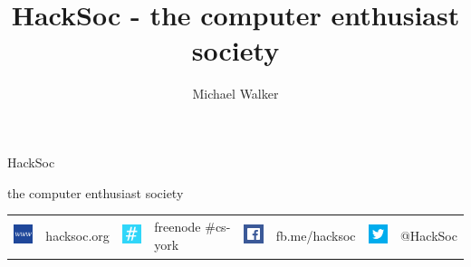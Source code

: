\documentclass[10pt,a4paper,oneside]{article}
\author{Michael Walker}
\title{HackSoc - the computer enthusiast society}
\begin{document}

\begin{adjustbox}{minipage=0.9\linewidth,center}
  {\fontsize{2.75cm}{1em}  HackSoc}

  \vspace{0.35cm}

  \hfill {\fontsize{0.9cm}{1em}  the computer enthusiast society}
\end{adjustbox}



\vspace{0.3cm}

\begin{tabular}{llllllll}
\multicolumn{1}{m{1cm}}{\includegraphics[width=1cm, height=1cm]{www-512.png}} &
hacksoc.org &
\multicolumn{1}{m{1cm}}{\includegraphics[width=1cm, height=1cm]{irc-512.png}} &
freenode \#cs-york &
\multicolumn{1}{m{1cm}}{\includegraphics[width=1cm, height=1cm]{facebook-512.png}} &
fb.me/hacksoc &
\multicolumn{1}{m{1cm}}{\includegraphics[width=1cm, height=1cm]{twitter-512.png}} &
@HackSoc
\end{tabular}
\end{document}
